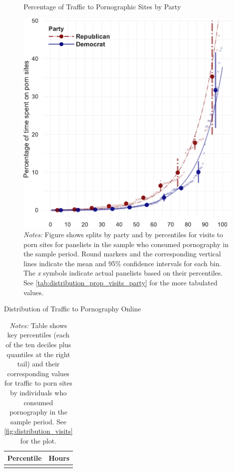 \documentclass[12pt, letterpaper]{article}
\begin{document}
\begin{figure}
	\centering
	\caption{Percentage of Traffic to Pornographic Sites by Party}
	\includegraphics[width=.55\linewidth]{../figs/distribution_proportion_visits_to_adultsites_by_party.pdf}
	\caption*{\footnotesize \emph{Notes:} 
		Figure shows splits by party and by percentiles for visits to porn sites for panelists in the sample who consumed pornography in the sample period.
		Round markers and the corresponding vertical lines indicate the mean and 95\% confidence intervals for each bin.
		The \emph{x} symbols indicate actual panelists based on their percentiles.
		See \cref{tab:distribution_prop_visits_party} for the more tabulated values.
	}
	\label{fig:distribution_prop_visits_party}
\end{figure}



\begin{table} \centering \small \setlength\tabcolsep{10 pt}
	\caption{Distribution of Traffic to Pornography Online}
	\label{tab:distribution_visits}
	\begin{adjustbox}{max width=\textwidth}
		\begin{tabular}{cr}
			\toprule
			\multicolumn{1}{c}{\textbf{Percentile}}&\multicolumn{1}{c}{\textbf{Hours}}\\
			\midrule
			\\
			\bottomrule
		\end{tabular}
	\end{adjustbox}
	\caption*{\footnotesize \emph{Notes:} 
		Table shows key percentiles (each of the ten deciles plus quantiles at the right tail) and their corresponding values for traffic to porn sites by individuals who consumed pornography in the sample period. 
		See \cref{fig:distribution_visits} for the plot.
	}
\end{table}
\end{document}
